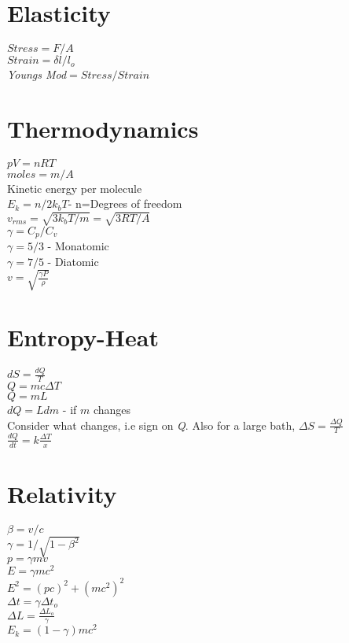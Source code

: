 \begin{multicols}{2}
    \chapter{Elasticity}
    \newlength{\MyLen}
    $ Stress=F/A$\\
    $Strain=\delta l / l_o$\\
    \textit{Youngs Mod}$=Stress/Strain$\\

    \chapter{Thermodynamics}
    $pV=nRT$\\
    $moles=m/A$\\
    Kinetic energy per molecule\\
    $E_k=n/2k_bT$- n=Degrees of freedom\\
    $v_{rms}=\sqrt{3k_bT/m}=\sqrt{3RT/A}$\\
    $\gamma=C_p/C_v$\\
    $\gamma=5/3$ - Monatomic\\
    $\gamma=7/5$ - Diatomic \\
    $v=\sqrt{\frac{\gamma P}{\rho}}$\\

    \chapter{Entropy-Heat}
    $dS=\frac{dQ}{T}$\\
    $Q=mc\Delta T$\\
    $Q=mL$\\
    $dQ=L dm$ - if $m$ changes\\
    Consider what changes, 
    i.e sign on \textit{Q}.
    Also for a large bath,
    $\Delta S=\frac{\Delta Q}{T}$\\
    $\frac{dQ}{dt}=k \frac{\Delta T}{ x}$\\

    \chapter{Relativity}
    $\beta=v/c$\\
    $\gamma=1/\sqrt{1-\beta^2}$\\
    $p=\gamma mv$\\
    $E=\gamma mc^2$\\
    $E^2=(pc)^2+(mc^2)^2$\\
    $\Delta t=\gamma \Delta t_o$\\
    $\Delta L= \frac{\Delta L_o}{\gamma}$\\
    $E_k=(1-\gamma)mc^2$\\


\end{multicols}
